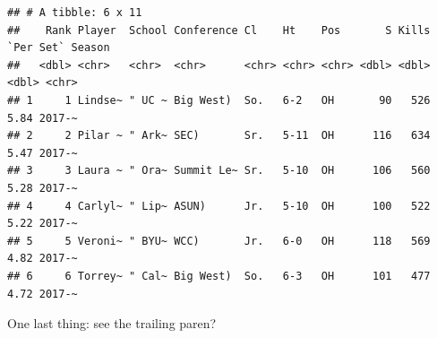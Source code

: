 \documentclass[]{book}
\newenvironment{Shaded}{\begin{snugshade}}{\end{snugshade}}
\newcommand{\CharTok}[1]{\textcolor[rgb]{0.31,0.60,0.02}{#1}}
\newcommand{\DataTypeTok}[1]{\textcolor[rgb]{0.13,0.29,0.53}{#1}}
\newcommand{\KeywordTok}[1]{\textcolor[rgb]{0.13,0.29,0.53}{\textbf{#1}}}
\newcommand{\NormalTok}[1]{#1}
\newcommand{\OperatorTok}[1]{\textcolor[rgb]{0.81,0.36,0.00}{\textbf{#1}}}
\newcommand{\OtherTok}[1]{\textcolor[rgb]{0.56,0.35,0.01}{#1}}
\newcommand{\StringTok}[1]{\textcolor[rgb]{0.31,0.60,0.02}{#1}}
\begin{document}
\begin{Shaded}
\end{Shaded}

\begin{verbatim}
## # A tibble: 6 x 11
##    Rank Player  School Conference Cl    Ht    Pos       S Kills `Per Set` Season
##   <dbl> <chr>   <chr>  <chr>      <chr> <chr> <chr> <dbl> <dbl>     <dbl> <chr> 
## 1     1 Lindse~ " UC ~ Big West)  So.   6-2   OH       90   526      5.84 2017-~
## 2     2 Pilar ~ " Ark~ SEC)       Sr.   5-11  OH      116   634      5.47 2017-~
## 3     3 Laura ~ " Ora~ Summit Le~ Sr.   5-10  OH      106   560      5.28 2017-~
## 4     4 Carlyl~ " Lip~ ASUN)      Jr.   5-10  OH      100   522      5.22 2017-~
## 5     5 Veroni~ " BYU~ WCC)       Jr.   6-0   OH      118   569      4.82 2017-~
## 6     6 Torrey~ " Cal~ Big West)  So.   6-3   OH      101   477      4.72 2017-~
\end{verbatim}

One last thing: see the trailing paren?
\end{document}
